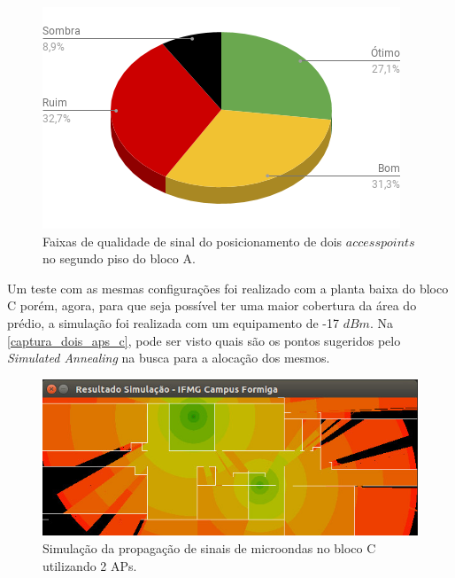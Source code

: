 \documentclass[
	12pt,				%
	twoside,			%
	a4paper,			%
	english,			%
	french,				%
	spanish,			%
	brazil				%
	]{abntex2}
\begin{document}
\begin{figure}[ht]
    \caption{\label{percent_bloco_a_2} Faixas de qualidade de sinal do posicionamento de dois $access points$ no segundo piso do bloco A. }
    \begin{center}
        \includegraphics[scale=0.7]{imagens/percent-bloco-a-2.png}
    \end{center}
\end{figure}

Um teste com as mesmas configurações foi realizado com a planta baixa do
bloco C porém, agora, para que seja possível ter uma maior cobertura da
área do prédio, a simulação foi realizada com um equipamento de -17
\(dBm\). Na \autoref{captura_dois_aps_c}, pode ser visto quais são os
pontos sugeridos pelo \emph{Simulated Annealing} na busca para a
alocação dos mesmos.

\begin{figure}[ht]
    \caption{\label{captura_dois_aps_c} Simulação da propagação de sinais de microondas no bloco C utilizando 2 APs.
    }
    \begin{center}
        \includegraphics[scale=0.7]{imagens/captura-2-aps-bloco-c-2.jpg}
    \end{center}
\end{figure}
\end{document}

